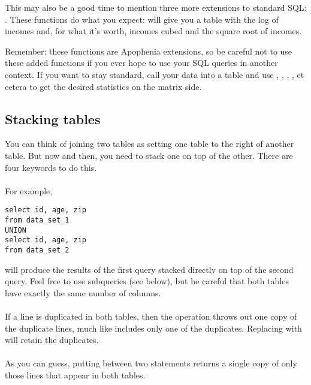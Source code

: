 This may also be a good time to mention three more extensions to standard
SQL: . These functions do what you expect:
will give you a table with the log of incomes and, for what it's worth,
incomes cubed and the square root of incomes.

Remember: these functions are Apophenia extensions, so be careful not to
use these added functions if you ever hope to use your SQL queries in
another context. If you want to stay standard, call your data into
a table and use , ,
, , et cetera to get the desired
statistics on the matrix side.

\subsection{Stacking tables}
You can think of joining two tables as setting one table to the right of
another table. But now and then, you need to stack one on top of
the other. There are four keywords to do this.

\paragraph{} For example, 
\begin{lstlisting}
select id, age, zip
from data_set_1
UNION
select id, age, zip
from data_set_2
\end{lstlisting}
will produce the results of the first query stacked directly on top of
the second query. Feel free to use subqueries (see below), but be
careful that both tables have exactly the same number of columns.

\paragraph{} If a line is duplicated in both tables,
then the  operation throws out
one copy of the duplicate lines, much like 
includes only one of the duplicates. Replacing  with  will retain the duplicates.

\paragraph{} As you can guess,
putting  between two  statements
returns a single copy of only those lines that appear in both tables.


